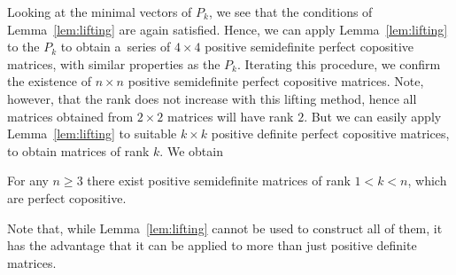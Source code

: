 \documentclass{commat}
\begin{document}
Looking at the minimal vectors of \(P_k \), we see that the conditions of Lemma~\ref{lem:lifting}
are again satisfied.
Hence, we can apply Lemma~\ref{lem:lifting} to the \(P_k \) to obtain a~series of \(4\times 4 \)
positive semidefinite perfect copositive matrices, with similar properties as the \(P_k \).
Iterating this procedure, we confirm the existence of \(n\times n \) positive semidefinite
perfect copositive matrices.
Note, however, that the rank does not increase with this lifting method, hence all matrices obtained
from \(2\times 2 \) matrices will have rank $2$.
But we can easily apply Lemma~\ref{lem:lifting} to suitable \(k\times k \) positive definite
perfect copositive matrices, to obtain matrices of rank $k$.
We obtain
\begin{corollary}
    For any \(n\geq 3 \) there exist positive semidefinite matrices of rank \(1< k <n \),
    which are perfect copositive.
\end{corollary}
Note that, while Lemma~\ref{lem:lifting} cannot be used to construct all of them,
it has the advantage that it can be applied to more than just positive definite matrices.
\end{document}
